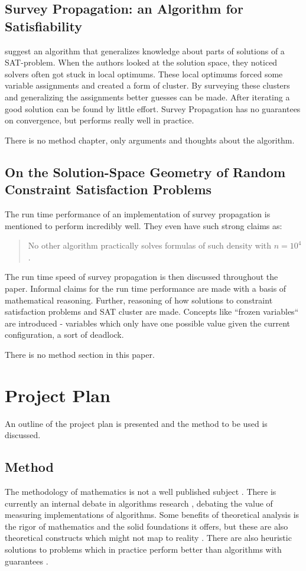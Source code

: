 \documentclass[msc,lith,english]{liuthesis}
\begin{document}
\section{Survey Propagation: an Algorithm for Satisfiability}
\citeauthor{sourceSurveyProp} \cite{sourceSurveyProp} suggest an algorithm that generalizes knowledge about parts of solutions of a SAT-problem. 
When the authors looked at the solution space, they noticed solvers often got stuck in local optimums.
These local optimums forced some variable assignments and created a form of cluster.
By surveying these clusters and generalizing the assignments better guesses can be made.
After iterating a good solution can be found by little effort.
Survey Propagation has no guarantees on convergence, but performs really well in practice.

There is no method chapter, only arguments and thoughts about the algorithm.

\section{On the Solution-Space Geometry of Random Constraint Satisfaction Problems}
The run time performance of an implementation of survey propagation is mentioned to perform incredibly well.
They even have such strong claims as:
\blockquote{No other algorithm practically solves formulas of such density with $n=10^4$.}
\cite{sourceSolutionSpace}

The run time speed of survey propagation is then discussed throughout the paper.
Informal claims for the run time performance are made with a basis of mathematical reasoning.
Further, reasoning of how solutions to constraint satisfaction problems and SAT cluster are made.
Concepts like ``frozen variables`` are introduced - variables which only have one
possible value given the current configuration, a sort of deadlock.

There is no method section in this paper.

\chapter{Project Plan}
An outline of the project plan is presented and the method to be used is discussed.

\section{Method}
The methodology of mathematics is not a well published subject \cite{sourceMethodMath}.
There is currently an internal debate in algorithms research \cite{sourceUllman}, debating the value of measuring implementations of algorithms.
Some benefits of theoretical analysis is the rigor of mathematics and the solid foundations it offers, but these are also theoretical constructs which might not map to reality \cite{sourceAlgorithmEngineeering}.
There are also heuristic solutions to problems which in practice perform better than algorithms with guarantees \cite{sourceSolutionSpace,sourceSurveyProp}.
\end{document}
